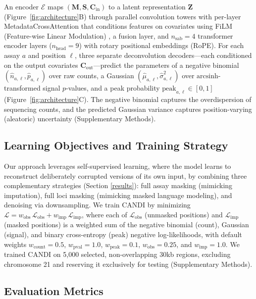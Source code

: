 An encoder $\mathcal{E}$ maps $(\mathbf{M}, \mathbf{S}, \mathbf{C}_{\text{in}})$ to a latent representation $\mathbf{Z}$ (Figure~\ref{fig:architecture}B) through parallel convolution towers with per-layer MetadataCrossAttention that conditions features on covariates using FiLM (Feature-wise Linear Modulation) \cite{perez2018film}, a fusion layer, and $n_{\text{sab}} = 4$ transformer encoder layers ($n_{\text{head}} = 9$) with rotary positional embeddings (RoPE). For each assay $a$ and position $\ell$, three separate deconvolution decoders---each conditioned on the output covariates $\mathbf{C}_{\text{out}}$---predict the parameters of a negative binomial $(\hat{n}_{a,\ell}, \hat{p}_{a,\ell})$ over raw counts, a Gaussian $(\hat{\mu}_{a,\ell}, \hat{\sigma}^2_{a,\ell})$ over $\text{arcsinh}$-transformed signal $p$-values, and a peak probability $\text{peak}_{a,\ell} \in [0,1]$ (Figure~\ref{fig:architecture}C). The negative binomial captures the overdispersion of sequencing counts, and the predicted Gaussian variance captures position-varying (aleatoric) uncertainty (Supplementary Methods).

\subsection{Learning Objectives and Training Strategy}

Our approach leverages self-supervised learning, where the model learns to reconstruct deliberately corrupted versions of its own input, by combining three complementary strategies (Section \ref{results}): full assay masking (mimicking imputation), full loci masking (mimicking masked language modeling), and denoising via downsampling. We train CANDI by minimizing $\mathcal{L} = w_{\text{obs}}\, \mathcal{L}_{\text{obs}} + w_{\text{imp}}\, \mathcal{L}_{\text{imp}}$, where each of $\mathcal{L}_{\text{obs}}$ (unmasked positions) and $\mathcal{L}_{\text{imp}}$ (masked positions) is a weighted sum of the negative binomial (count), Gaussian (signal), and binary cross-entropy (peak) negative log-likelihoods, with default weights $w_{\text{count}} = 0.5$, $w_{\text{pval}} = 1.0$, $w_{\text{peak}} = 0.1$, $w_{\text{obs}} = 0.25$, and $w_{\text{imp}} = 1.0$. We trained CANDI on 5,000 selected, non-overlapping 30kb regions, excluding chromosome 21 and reserving it exclusively for testing (Supplementary Methods).

\subsection{Evaluation Metrics}


